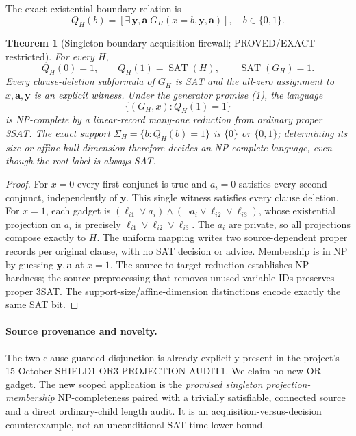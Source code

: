 \documentclass[11pt]{article}
\newtheorem{theorem}{Theorem}
\begin{document}
The exact existential boundary relation is
\[
 Q_H(b)=
 [\exists\,\mathbf y,\mathbf a\;G_H(x=b,\mathbf y,\mathbf a)],
 \quad b\in\{0,1\}.\tag{2}
\]
\begin{theorem}[Singleton-boundary acquisition firewall; PROVED/EXACT restricted]
For every $H$,
\[
 Q_H(0)=1,\qquad Q_H(1)=\operatorname{SAT}(H),
 \qquad\operatorname{SAT}(G_H)=1.\tag{3}
\]
Every clause-deletion subformula of $G_H$ is SAT and the all-zero assignment to $x,\mathbf a,\mathbf y$ is an explicit witness. Under the generator promise (1), the language
\[
 \{(G_H,x):Q_H(1)=1\}
\]
is NP-complete by a linear-record many-one reduction from ordinary proper 3SAT. The exact support $\Sigma_H=\{b:Q_H(b)=1\}$ is $\{0\}$ or $\{0,1\}$; determining its size or affine-hull dimension therefore decides an NP-complete language, even though the root label is always SAT.
\end{theorem}
\begin{proof}
For $x=0$ every first conjunct is true and $a_i=0$ satisfies every second conjunct, independently of $\mathbf y$. This single witness satisfies every clause deletion. For $x=1$, each gadget is
$(\ell_{i1}\vee a_i)\wedge(\neg a_i\vee\ell_{i2}\vee\ell_{i3})$,
whose existential projection on $a_i$ is precisely
$\ell_{i1}\vee\ell_{i2}\vee\ell_{i3}$.
The $a_i$ are private, so all projections compose exactly to $H$.
The uniform mapping writes two source-dependent proper records per original clause, with no SAT decision or advice. Membership is in NP by guessing $\mathbf y,\mathbf a$ at $x=1$. The source-to-target reduction establishes NP-hardness; the source preprocessing that removes unused variable IDs preserves proper 3SAT. The support-size/affine-dimension distinctions encode exactly the same SAT bit.
\end{proof}

\paragraph{Source provenance and novelty.}
The two-clause guarded disjunction is already explicitly present in the project's 15 October SHIELD1 OR3-PROJECTION-AUDIT1. We claim no new OR-gadget. The new scoped application is the \emph{promised singleton projection-membership} NP-completeness paired with a trivially satisfiable, connected source and a direct ordinary-child length audit. It is an acquisition-versus-decision counterexample, not an unconditional SAT-time lower bound.
\end{document}
